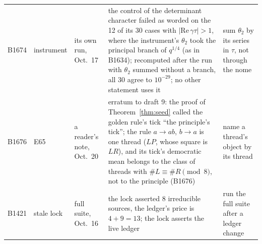 {\begin{longtable}{@{}p{1.8cm}p{1.65cm}p{2.0cm}p{5.05cm}p{3.6cm}@{}}
B1674 & instrument & its own run, Oct.\ 17 & the control of the determinant character failed as worded on the 12 of its 30 cases with $|\mathrm{Re}\,\gamma\tau|>1$, where the instrument's $\theta_2$ took the principal branch of $q^{1/4}$ (as in B1634); recomputed after the run with $\theta_2$ summed without a branch, all 30 agree to $10^{-29}$; no other statement uses it & sum $\theta_2$ by its series in $\tau$, not through the nome \\
B1676 & E65 & a reader's note, Oct.\ 20 & erratum to draft 9: the proof of Theorem~\ref{thm:seed} called the golden rule's tick ``the principle's tick''; the rule $a\to ab$, $b\to a$ is one thread ($LP$, whose square is $LR$), and its tick's democratic mean belongs to the class of threads with $\#L\equiv\#R\pmod 8$, not to the principle (B1676) & name a thread's object by its thread \\
B1421 & stale lock & full suite, Oct.\ 16 & the lock asserted 8 irreducible sources, the ledger's price is $4+9=13$; the lock asserts the live ledger & run the full suite after a ledger change \\
\end{longtable}}
